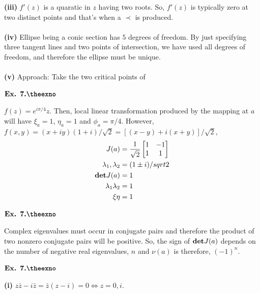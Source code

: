 \documentclass{article}
\def\tf{\textbf}
\def\mf{\ensuremath\mathbf}
\def\det{\ensuremath\mf{det}}
\newcounter{exno}
\begin{document}
\tf{(iii)} $f'(z)$ is a quaratic in $z$ having two roots. So, $f'(z)$ is typically zero at two distinct points and that's when a $\prec$ is produced.\\~\\

\tf{(iv)} Ellipse being a conic section has $5$ degrees of freedom. By just specifying three tangent lines and two points of intersection, we have used all degrees of freedom, and therefore the ellipse must be unique.\\~\\

\tf{(v)} Approach: Take the two critical points of

\vspace{0.2in}

${\textbf{Ex. 7.\theexno}}$
\addtocounter{exno}{1}

$f(z) = e^{i\pi/4}z$. Then, local linear transformation produced by the mapping at $a$ will have $\xi_a=1$, $\eta_a=1$ and $\phi_a = \pi/4$. However, $f(x,y) = (x+iy)(1+i)/\sqrt{2} = [(x-y)+i(x+y)]/\sqrt{2}$,
\begin{align*}
    J(a) &= \frac{1}{\sqrt{2}}\begin{bmatrix}1&-1\\1&1\end{bmatrix}\\
    \lambda_1, \lambda_2 &= (1\pm i)/sqrt{2}\\
    \det J(a) &= 1\\
    \lambda_1\lambda_2 &= 1\\
    \xi\eta &= 1
\end{align*}

\vspace{0.2in}

${\textbf{Ex. 7.\theexno}}$
\addtocounter{exno}{1}

Complex eigenvalues must occur in conjugate pairs and therefore the product of two nonzero conjugate pairs will be positive. So, the sign of $\det J(a)$ depends on the number of negative real eigenvalues, $n$ and $\nu(a)$ is therefore, $(-1)^n$.

\vspace{0.2in}

${\textbf{Ex. 7.\theexno}}$
\addtocounter{exno}{1}

\tf{(i)} $z\bar{z}-i\bar{z}=\bar{z}(z-i) = 0 \iff z = 0,i$.\\~\\
\end{document}
